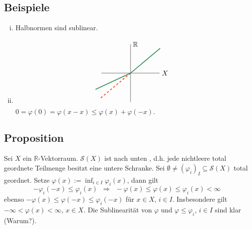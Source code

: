\subsection[Beispiele für sublineare Abbildungen]{Beispiele} %
\label{sub:218}
\begin{enumerate}[(i)]
	\item Halbnormen sind sublinear.
	\item \[
		\begin{tikzpicture}[scale=0.5]
			\draw (-3,0) -- (3,0) node[right]{$X$};
			\draw (0,-3) -- (0,3) node[right]{$\mathds{R}$};
			\draw[very thick, dashed,OrangeRed2] (0,0) -- (220:4);
			\draw[very thick,SeaGreen4] (40:4) -- (0,0) -- (205:4);
		\end{tikzpicture}
	\]
	$0 = \varphi(0) = \varphi(x-x) \le \varphi(x) + \varphi(-x)$.
\end{enumerate}

\subsection[Proposition: Die sublinearen Abbildungen $\mathcal{S}(X)$ sind nach unten induktiv geordnet]{Proposition} %
\label{sub:219}
Sei $X$ ein $\mathds{R}$-Vektorraum. $\mathcal{S}(X)$ ist nach unten , d.h. jede nichtleere total geordnete Teilmenge besitzt eine untere Schranke.
Sei $\emptyset \not= (\varphi_i)_{I} \subseteq \mathcal{S}(X)$ total geordnet. Setze $\varphi(x) := \inf_{i \in I} \varphi_i(x)$, dann gilt 
\[
	- \varphi_i(-x) \le \varphi_i(x) \enspace\Longrightarrow \enspace- \varphi(x) \le \varphi(x) \le \varphi_i(x) < \infty
\]
ebenso $-\varphi(x) \le \varphi(-x) \le \varphi_i(-x)$ für $x \in X$, $i \in I$. Insbesondere gilt $- \infty <  \varphi(x) < \infty$, $x \in X$. 
Die Sublinearität von $\varphi$ und $\varphi \le \varphi_i$, $i \in I$ sind klar (Warum?). \bewende

